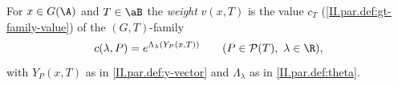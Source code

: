 For $x\in G(\A)$ and $T\in\aB$ the \emph{weight} $v(x,T)$ is the value $c_T$ (\cref{II.par.def:gt-family-value}) of the $(G,T)$-family
\[
  c(\lambda,P)=e^{\Lambda_\lambda(Y_P(x,T))}\qquad(P\in\mathcal P(T),\ \lambda\in\R),
\]
with $Y_P(x,T)$ as in \cref{II.par.def:y-vector} and $\Lambda_\lambda$ as in \cref{II.par.def:theta}.
